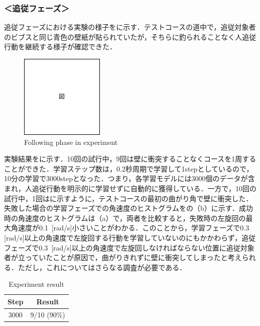 \newpage

  \subsubsection*{＜追従フェーズ＞}
  
  追従フェーズにおける実験の様子をに示す．テストコースの道中で，追従対象者のビブスと同じ青色の壁紙が貼られていたが，そちらに釣られることなく人追従行動を継続する様子が確認できた．

  \begin{figure}[h]
    \centering
    \includegraphics[keepaspectratio, scale=0.80] {images/figure.png}
    \captionsetup{justification=raggedright} %
    \caption{Following phase in experiment}
    \label{Fig:Following phase in experiment}
  \end{figure}

  実験結果をに示す．10回の試行中，9回は壁に衝突することなくコースを1周することができた．学習ステップ数は，0.2秒周期で学習して1stepとしているので，10分の学習で3000stepとなった．つまり，各学習モデルには3000個のデータが含まれ，人追従行動を明示的に学習せずに自動的に獲得している．一方で，10回の試行中，1回はに示すように，テストコースの最初の曲がり角で壁に衝突した．失敗した場合の学習フェーズでの角速度のヒストグラムをの（b）に示す．成功時の角速度のヒストグラムは（a）で，両者を比較すると，失敗時の左旋回の最大角速度が0.1\, [rad/s]小さいことがわかる．このことから，学習フェーズで0.3\, [rad/s]以上の角速度で左旋回する行動を学習していないのにもかかわらず，追従フェーズで0.3\, [rad/s]以上の角速度で左旋回しなければならない位置に追従対象者が立っていたことが原因で，曲がりきれずに壁に衝突してしまったと考えられる．ただし，これについてはさらなる調査が必要である．

  \begin{table}[h]
    \caption{Experiment result}
    \label{tab:Experiment result}
    \centering
    \begin{tabular}{|c|c|}
    \hline
    Step & Result      \\ \hline
    3000 & 9/10 (90\%) \\ \hline
    \end{tabular}
    \end{table}

